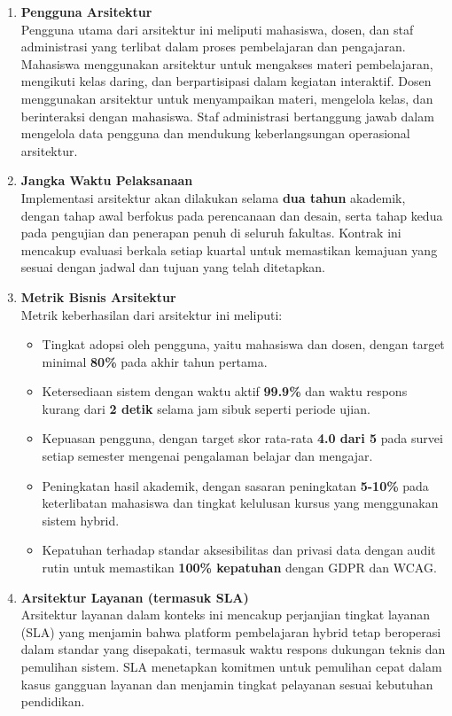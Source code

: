 \begin{enumerate}
	\item \textbf{Pengguna Arsitektur} \\
	Pengguna utama dari arsitektur ini meliputi mahasiswa, dosen, dan staf administrasi yang terlibat dalam proses pembelajaran dan pengajaran. Mahasiswa menggunakan arsitektur untuk mengakses materi pembelajaran, mengikuti kelas daring, dan berpartisipasi dalam kegiatan interaktif. Dosen menggunakan arsitektur untuk menyampaikan materi, mengelola kelas, dan berinteraksi dengan mahasiswa. Staf administrasi bertanggung jawab dalam mengelola data pengguna dan mendukung keberlangsungan operasional arsitektur.
	
	\item \textbf{Jangka Waktu Pelaksanaan} \\
	Implementasi arsitektur akan dilakukan selama \textbf{dua tahun} akademik, dengan tahap awal berfokus pada perencanaan dan desain, serta tahap kedua pada pengujian dan penerapan penuh di seluruh fakultas. Kontrak ini mencakup evaluasi berkala setiap kuartal untuk memastikan kemajuan yang sesuai dengan jadwal dan tujuan yang telah ditetapkan.
	
	\item \textbf{Metrik Bisnis Arsitektur} \\
	Metrik keberhasilan dari arsitektur ini meliputi:
	\begin{itemize}
		\item Tingkat adopsi oleh pengguna, yaitu mahasiswa dan dosen, dengan target minimal \textbf{80\%} pada akhir tahun pertama.
		\item Ketersediaan sistem dengan waktu aktif \textbf{99.9\%} dan waktu respons kurang dari \textbf{2 detik} selama jam sibuk seperti periode ujian.
		\item Kepuasan pengguna, dengan target skor rata-rata \textbf{4.0 dari 5} pada survei setiap semester mengenai pengalaman belajar dan mengajar.
		\item Peningkatan hasil akademik, dengan sasaran peningkatan \textbf{5-10\%} pada keterlibatan mahasiswa dan tingkat kelulusan kursus yang menggunakan sistem hybrid.
		\item Kepatuhan terhadap standar aksesibilitas dan privasi data dengan audit rutin untuk memastikan \textbf{100\% kepatuhan} dengan GDPR dan WCAG.
	\end{itemize}
	
	\item \textbf{Arsitektur Layanan (termasuk SLA)} \\
	Arsitektur layanan dalam konteks ini mencakup perjanjian tingkat layanan (SLA) yang menjamin bahwa platform pembelajaran hybrid tetap beroperasi dalam standar yang disepakati, termasuk waktu respons dukungan teknis dan pemulihan sistem. SLA menetapkan komitmen untuk pemulihan cepat dalam kasus gangguan layanan dan menjamin tingkat pelayanan sesuai kebutuhan pendidikan.
	
\end{enumerate}


